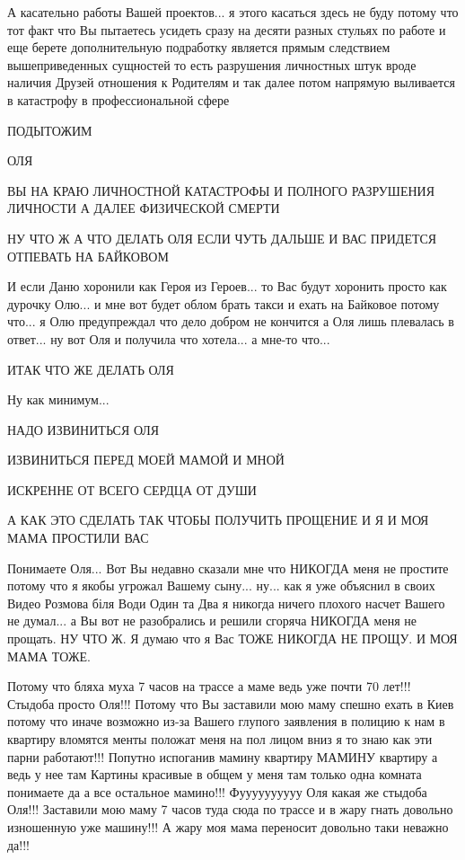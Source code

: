 А касательно работы Вашей проектов... я этого касаться здесь не буду потому что
тот факт что Вы пытаетесь усидеть сразу на десяти разных стульях по работе и
еще берете дополнительную подработку является прямым следствием вышеприведенных
сущностей то есть разрушения личностных штук вроде наличия Друзей отношения к
Родителям и так далее потом напрямую выливается в катастрофу в профессиональной
сфере

ПОДЫТОЖИМ

ОЛЯ

ВЫ НА КРАЮ ЛИЧНОСТНОЙ КАТАСТРОФЫ И ПОЛНОГО РАЗРУШЕНИЯ ЛИЧНОСТИ А ДАЛЕЕ ФИЗИЧЕСКОЙ СМЕРТИ

НУ ЧТО Ж А ЧТО ДЕЛАТЬ ОЛЯ ЕСЛИ ЧУТЬ ДАЛЬШЕ И ВАС ПРИДЕТСЯ ОТПЕВАТЬ НА БАЙКОВОМ 

И если Даню хоронили как Героя из Героев... то Вас будут хоронить просто как
дурочку Олю... и мне вот будет облом брать такси и ехать на Байковое потому что...
я Олю предупреждал что дело добром не кончится а Оля лишь плевалась в ответ...
ну вот Оля и получила что хотела... а мне-то что...

ИТАК ЧТО ЖЕ ДЕЛАТЬ ОЛЯ

Ну как минимум...

НАДО ИЗВИНИТЬСЯ ОЛЯ 

ИЗВИНИТЬСЯ ПЕРЕД МОЕЙ МАМОЙ И МНОЙ

ИСКРЕННЕ ОТ ВСЕГО СЕРДЦА ОТ ДУШИ

А КАК ЭТО СДЕЛАТЬ ТАК ЧТОБЫ ПОЛУЧИТЬ ПРОЩЕНИЕ 
И Я И МОЯ МАМА ПРОСТИЛИ ВАС

Понимаете Оля... Вот Вы недавно сказали мне что НИКОГДА меня не простите
потому что я якобы угрожал Вашему сыну... ну... как я уже объяснил в своих Видео
Розмова біля Води Один та Два я никогда ничего плохого насчет Вашего не думал...
а Вы вот не разобрались и решили сгоряча НИКОГДА меня не прощать. НУ ЧТО Ж.
Я думаю что я Вас ТОЖЕ НИКОГДА НЕ ПРОЩУ. И МОЯ МАМА ТОЖЕ.

Потому что бляха муха 7 часов на трассе а маме ведь уже почти 70 лет!!!
Стыдоба просто Оля!!! Потому что Вы заставили мою маму спешно ехать в Киев
потому что иначе возможно из-за Вашего глупого заявления в полицию к нам в
квартиру вломятся менты положат меня на пол лицом вниз я то знаю как эти парни
работают!!!  Попутно испоганив мамину квартиру МАМИНУ квартиру а ведь у нее там
Картины красивые в общем у меня там только одна комната понимаете да а все
остальное мамино!!!  Фуууууууууу Оля какая же стыдоба Оля!!! Заставили мою маму
7 часов туда сюда по трассе и в жару гнать довольно изношенную уже машину!!! А жару
моя мама переносит довольно таки неважно да!!!

